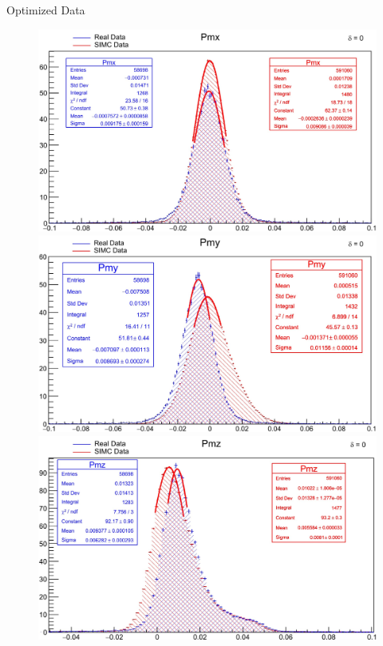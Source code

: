 \documentclass[final]{beamer}
\newlength{\colwidth}
\begin{document}
\begin{frame}[t]
\begin{columns}[t]
\begin{column}{\colwidth}
\begin{block}{Optimized Data}
\begin{figure}
  \vspace{0cm}  %

 \begin{minipage}[t]{0.3\textwidth}
    \includegraphics[width=\linewidth]{calibrated data/model 0/Pmx_0.jpg}
  \end{minipage}
  \begin{minipage}[t]{0.3\textwidth}
    \includegraphics[width=\linewidth]{calibrated data/model 0/Pmy_0.jpg}
  \end{minipage}
  \begin{minipage}[t]{0.3\textwidth}
    \includegraphics[width=\linewidth]{calibrated data/model 0/Pmz_0.jpg}

\end{minipage}
\end{figure}
\end{block}
\end{column}
\end{columns}
\end{frame}
\end{document}
